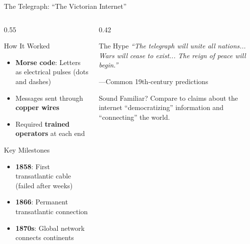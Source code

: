 \documentclass[aspectratio=169,11pt]{beamer}
\begin{document}
\begin{frame}{The Telegraph: ``The Victorian Internet''}
\begin{columns}
\begin{column}{0.55\textwidth}
\begin{block}{How It Worked}
\begin{itemize}
  \item \textbf{Morse code}: Letters as electrical pulses (dots and dashes)
  \item Messages sent through \textbf{copper wires}
  \item Required \textbf{trained operators} at each end
\end{itemize}
\end{block}

\begin{exampleblock}{Key Milestones}
\begin{itemize}
  \item \textbf{1858}: First transatlantic cable (failed after weeks)
  \item \textbf{1866}: Permanent transatlantic connection
  \item \textbf{1870s}: Global network connects continents
\end{itemize}
\end{exampleblock}
\end{column}

\begin{column}{0.42\textwidth}
\begin{alertblock}{The Hype}
\small
\textit{``The telegraph will unite all nations... Wars will cease to exist... The reign of peace will begin.''}

\vspace{0.3em}
---Common 19th-century predictions
\end{alertblock}

\vspace{0.3em}
\begin{block}{Sound Familiar?}
Compare to claims about the internet ``democratizing'' information and ``connecting'' the world.
\end{block}
\end{column}
\end{columns}
\end{frame}
\end{document}
